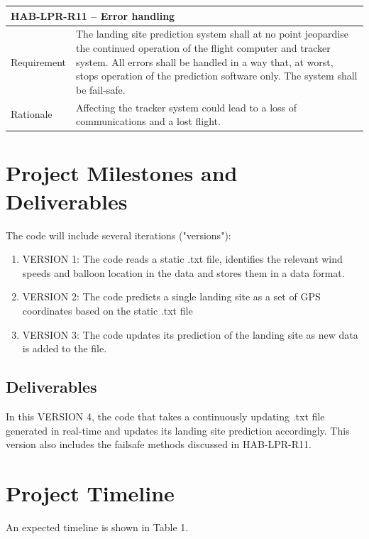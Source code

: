 \documentclass[11pt]{article}
\begin{document}
\begin{table}[!h] \centering
 \begin{tabular}{|p{2cm} p{11cm}|}
 \hline
  \multicolumn{2}{|l|}{HAB-LPR-R11 – Error handling} \\
  \hline
  Requirement & The landing site prediction system shall at no point jeopardise the continued operation of the flight computer and tracker system. All errors shall be handled in a way that, at worst, stops operation of the prediction software only. The system shall be fail-safe.  \\
  \hline
  Rationale & Affecting the tracker system could lead to a loss of communications and a lost flight.  \\
  \hline
 \end{tabular}
\end{table}

\section{Project Milestones and Deliverables}

The code will include several iterations ("versions"):

\begin{enumerate}
\item VERSION 1: The code reads a static .txt file, identifies the relevant wind speeds and balloon location in the data and stores them in a data format. 
\item VERSION 2: The code predicts a single landing site as a set of GPS coordinates based on the static .txt file
\item VERSION 3: The code updates its prediction of the landing site as new data is added to the file.
\end{enumerate}


\subsection{Deliverables}
In this VERSION 4, the code that takes a continuously updating .txt file generated in real-time and updates its landing site prediction accordingly. This version also includes the failsafe methods discussed in HAB-LPR-R11.

\section{Project Timeline}

An expected timeline is shown in Table 1.
\end{document}
